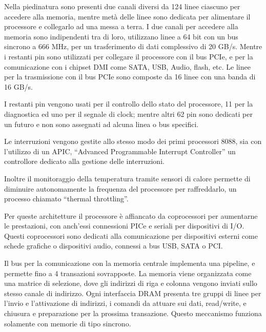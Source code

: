 \documentclass{article}
\numberwithin{equation}{subsection}
\begin{document}
Nella piedinatura sono presenti due canali diversi da 124 linee ciascuno per accedere alla memoria, mentre metà delle linee sono dedicata per alimentare il processore e collegarlo ad una 
messa a terra. 
I due canali per accedere alla memoria sono indipendenti tra di loro, utilizzano linee a 64 bit con un bus sincrono a 666 MHz, per un trasferimento di dati complessivo di 20 GB/s. 
Mentre i restanti pin sono utilizzati per collegare il processore con il bus PCIe, e per la comunicazione con i chipset DMI come SATA, USB, Audio, flash, etc. 
Le linee per la trasmissione con il bus PCIe sono composte da 16 linee con una banda di 16 GB/s. 

I restanti pin vengono usati per il controllo dello stato del processore, 11 per la diagnostica ed uno per il segnale di clock; mentre altri 62 pin sono dedicati per un futuro e non sono assegnati ad alcuna linea o bus 
specifici. 

Le interruzioni vengono gestite allo stesso modo dei primi processori 8088, sia con l'utilizzo di un APIC, ``Advanced Programmable Interrupt Controller'' un controllore dedicato alla 
gestione delle interruzioni. 

Inoltre il monitoraggio della temperatura tramite sensori di calore permette di diminuire autonomamente la frequenza del processore per raffreddarlo, un processo chiamato 
``thermal throttling''. 


Per queste architetture il processore è affiancato da coprocessori per aumentarne le prestazioni, con anch'essi connessioni PICe e seriali per dispositivi di I/O. Questi coprocessori 
sono dedicati alla comunicazione per dispositivi esterni come schede grafiche o dispositivi audio, connessi a bus USB, SATA o PCI. 


Il bus per la comunicazione con la memoria centrale implementa una pipeline, e permette fino a 4 transazioni sovrapposte. 
La memoria viene organizzata come una matrice di selezione, dove gli indirizzi di riga e colonna vengono inviati sullo stesso canale di indirizzo. 
Ogni interfaccia DRAM presenta tre gruppi di linee per l'invio e l'attivazione di indirizzi, i comandi da attuare sui dati, read/write, e chiusura e preparazione per la 
prossima transazione. Questo meccanismo funziona solamente con memorie di tipo sincrono. 
\end{document}
